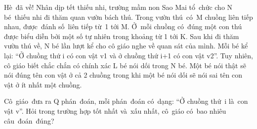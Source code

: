 Hè đã về! Nhân dịp  tết thiếu nhi, trường mầm non Sao Mai tổ chức cho  N bé thiếu nhi đi thăm quan vườn bách thú. Trong vườn  thú có M chuồng liên tiếp nhau, được đánh  số liên tiếp từ 1 tới M. Ở mỗi chuồng  có đúng một con thú được biểu diễn bởi một số  tự nhiên trong khoảng từ 1 tới K. Sau khi đi thăm vườn  thú về, N bé lần lượt kể cho cô giáo nghe về quan sát  của mình. Mỗi bé kể lại: “Ở chuồng thứ i có con vật  v1 và ở chuồng thứ i+1 có con vật v2”. Tuy nhiên, cô giáo  biết chắc chắn có chính xác L bé nói dối trong N bé. Một  bé nói thật sẽ nói đúng tên con vật ở cả 2 chuồng  trong khi một bé nói dối sẽ nói sai tên con vật ở ít  nhất một chuồng.     

      Cô giáo đưa ra  Q phán đoán, mỗi phán đoán có dạng: “Ở  chuồng thứ i là con vật v”. Hỏi trong trường  hợp tốt nhất và xấu nhất, cô giáo có bao  nhiêu câu đoán đúng?